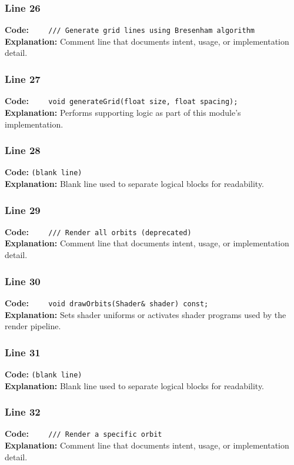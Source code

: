 \documentclass[11pt,a4paper]{article}
\begin{document}
\subsubsection*{Line 26}
\textbf{Code:} \verb|    /// Generate grid lines using Bresenham algorithm|\\
\textbf{Explanation:} Comment line that documents intent, usage, or implementation detail.

\subsubsection*{Line 27}
\textbf{Code:} \verb|    void generateGrid(float size, float spacing);|\\
\textbf{Explanation:} Performs supporting logic as part of this module's implementation.

\subsubsection*{Line 28}
\textbf{Code:} \texttt{(blank line)}\\
\textbf{Explanation:} Blank line used to separate logical blocks for readability.

\subsubsection*{Line 29}
\textbf{Code:} \verb|    /// Render all orbits (deprecated)|\\
\textbf{Explanation:} Comment line that documents intent, usage, or implementation detail.

\subsubsection*{Line 30}
\textbf{Code:} \verb|    void drawOrbits(Shader& shader) const;|\\
\textbf{Explanation:} Sets shader uniforms or activates shader programs used by the render pipeline.

\subsubsection*{Line 31}
\textbf{Code:} \texttt{(blank line)}\\
\textbf{Explanation:} Blank line used to separate logical blocks for readability.

\subsubsection*{Line 32}
\textbf{Code:} \verb|    /// Render a specific orbit|\\
\textbf{Explanation:} Comment line that documents intent, usage, or implementation detail.
\end{document}
